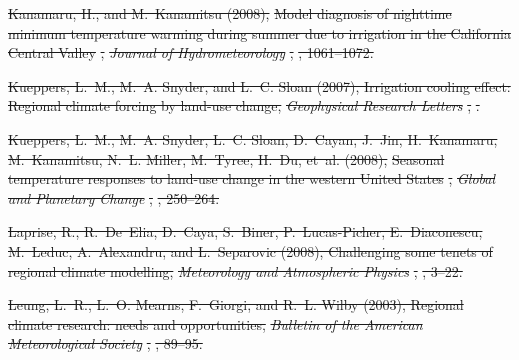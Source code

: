 \documentclass[draft,ms]{agutex}   %
\providecommand{\DIFdel}[1]{{\protect\color{red}\sout{#1}}}                      %
\begin{document}
\begin{article}
\DIFdel{Kanamaru, H., and M.~Kanamitsu (2008), }%
\DIFdel{Model diagnosis of nighttime minimum
  temperature warming during summer due to irrigation in the California Central
  Valley}%
\DIFdel{, }\textit{\DIFdel{Journal of Hydrometeorology}}%
\DIFdel{, }%
\DIFdel{, 1061--1072.
}%

\DIFdel{Kueppers, L.~M., M.~A. Snyder, and L.~C. Sloan (2007), Irrigation cooling
  effect: Regional climate forcing by land-use change, }\textit{\DIFdel{Geophysical
  Research Letters}}%
\DIFdel{, }%
\DIFdel{.
}%

\DIFdel{Kueppers, L.~M., M.~A. Snyder, L.~C. Sloan, D.~Cayan, J.~Jin, H.~Kanamaru,
  M.~Kanamitsu, N.~L. Miller, M.~Tyree, H.~Du, et~al. (2008), }%
\DIFdel{Seasonal
  temperature responses to land-use change in the western United States}%
\DIFdel{,
  }\textit{\DIFdel{Global and Planetary Change}}%
\DIFdel{, }%
\DIFdel{, 250--264.
}%

\DIFdel{Laprise, R., R.~De~Elia, D.~Caya, S.~Biner, P.~Lucas-Picher, E.~Diaconescu,
  M.~Leduc, A.~Alexandru, and L.~Separovic (2008), Challenging some tenets of
  regional climate modelling, }\textit{\DIFdel{Meteorology and Atmospheric Physics}}%
\DIFdel{,
  }%
\DIFdel{, 3--22.
}%

\DIFdel{Leung, L.~R., L.~O. Mearns, F.~Giorgi, and R.~L. Wilby (2003), Regional climate
  research: needs and opportunities, }\textit{\DIFdel{Bulletin of the American
  Meteorological Society}}%
\DIFdel{, }%
\DIFdel{, 89--95.
}%


\end{article}
\end{document}
